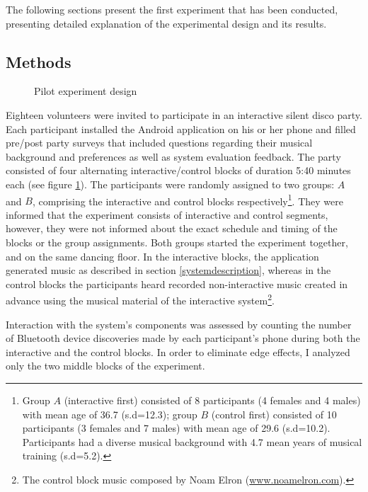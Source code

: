 \documentclass[a4paper,11pt]{article}
\begin{document}
{The following sections present the first experiment that has been conducted, presenting detailed explanation of the experimental design and its results.

\subsection{Methods}


\begin{figure}[!htb]
	\centering
	\def\svgwidth{0.95\columnwidth}
  	
	\caption{Pilot experiment design}\label{fig:pilot}
\end{figure}

Eighteen volunteers were invited to participate in an interactive silent disco party.
Each participant installed the Android application on his or her phone and filled pre/post party surveys that included questions regarding their musical background and preferences as well as system evaluation feedback.
The party consisted of four alternating interactive/control blocks of duration 5:40 minutes each (see figure \ref{fig:pilot}).
The participants were randomly assigned to two groups: $A$ and $B$, comprising the interactive and control blocks respectively\footnote{Group $A$ (interactive first) consisted of 8 participants (4 females and 4 males) with mean age of 36.7 (s.d=12.3); group $B$ (control first) consisted of 10 participants (3 females and 7 males) with mean age of 29.6 (s.d=10.2). Participants had a diverse musical background with 4.7 mean years of musical training (s.d=5.2).}.
They were informed that the experiment consists of interactive and control segments, however, they were not informed about the exact schedule and timing of the blocks or the group assignments.
Both groups started the experiment together, and on the same dancing floor.
In the interactive blocks, the application generated music as described in section \ref{systemdescription}, whereas in the control blocks the participants heard recorded non-interactive music created in advance using the musical material of the interactive system\footnote{The control block music composed by Noam Elron (\href{http://www.noamelron.com}{www.noamelron.com}).}.

Interaction with the system's components was assessed by counting the number of Bluetooth device discoveries made by each participant's phone during both the interactive and the control blocks.
In order to eliminate edge effects, I analyzed only the two middle blocks of the experiment.

}
\end{document}

